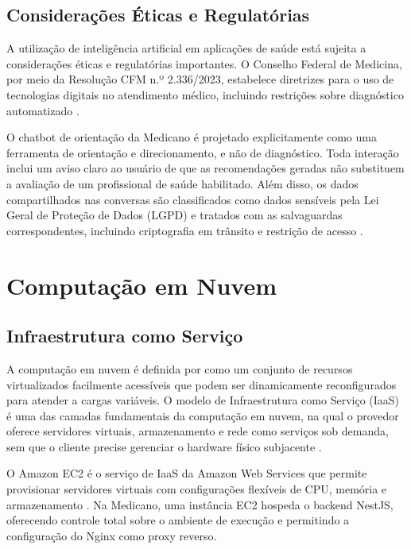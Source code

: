\subsection{Considerações Éticas e Regulatórias}
\label{subsec:ai-ethics}

A utilização de inteligência artificial em aplicações
de saúde está sujeita a considerações éticas e
regulatórias importantes. O Conselho Federal de Medicina,
por meio da Resolução CFM n.º 2.336/2023, estabelece
diretrizes para o uso de tecnologias digitais no
atendimento médico, incluindo restrições sobre
diagnóstico automatizado \cite{cfm2023}.

O chatbot de orientação da Medicano é projetado
explicitamente como uma ferramenta de orientação e
direcionamento, e não de diagnóstico. Toda interação
inclui um aviso claro ao usuário de que as recomendações
geradas não substituem a avaliação de um profissional
de saúde habilitado. Além disso, os dados compartilhados
nas conversas são classificados como dados sensíveis
pela Lei Geral de Proteção de Dados (LGPD) e tratados
com as salvaguardas correspondentes, incluindo
criptografia em trânsito e restrição de acesso
\cite{cfm2023}.

\section{Computação em Nuvem}
\label{sec:cloud}

\subsection{Infraestrutura como Serviço}
\label{subsec:iaas}

A computação em nuvem é definida por
 como um conjunto de recursos
virtualizados facilmente acessíveis que podem ser
dinamicamente reconfigurados para atender a cargas
variáveis. O modelo de Infraestrutura como Serviço
(IaaS) é uma das camadas fundamentais da computação
em nuvem, na qual o provedor oferece servidores
virtuais, armazenamento e rede como serviços sob
demanda, sem que o cliente precise gerenciar o
hardware físico subjacente \cite{vaquero2009}.

O Amazon EC2 é o serviço de IaaS da Amazon Web Services
que permite provisionar servidores virtuais com
configurações flexíveis de CPU, memória e armazenamento
\cite{awsec2}. Na Medicano, uma instância EC2 hospeda
o backend NestJS, oferecendo controle total sobre o
ambiente de execução e permitindo a configuração do
Nginx como proxy reverso.

